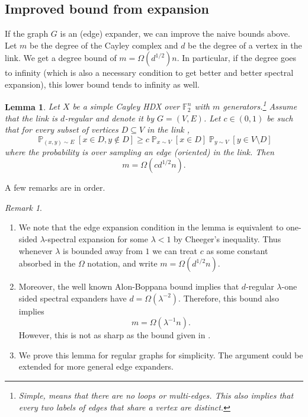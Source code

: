 \documentclass[10pt,a4paper]{article}
\newcommand{\prettyref}[1]{\cref{#1}}
\newtheorem{lemma}[theorem]{Lemma}
\theoremstyle{definition}
\theoremstyle{remark}
\newtheorem{remark}[theorem]{Remark}
\newcommand{\F}{\mathbb{F}}
\newcommand{\Psymb}{\mathbb{P}}
\DeclareMathOperator*{\ProbOp}{\Psymb}
\renewcommand{\Pr}{\ProbOp}
\newcommand{\Prob}[2][]{\Pr_{{#1}}\left[#2\right]} %
\renewcommand{\geq}{\geqslant}
\numberwithin{equation}{section}
\let\pref=\prettyref
\begin{document}
\subsection{Improved bound from expansion}
If the graph \(G\) is an (edge) expander, we can improve the naive bounds above. Let \(m\) be the degree of the Cayley complex and \(d\) be the degree of a vertex in the link. We get a degree bound of \(m = \Omega(d^{1/2})n\). In particular, if the degree goes to infinity (which is also a necessary condition to get better and better spectral expansion), this lower bound tends to infinity as well. %

\begin{lemma} \label{lem:deg-strong-lower-bound}
    Let \(X\) be a simple Cayley HDX over \(\F_2^n\) with \(m\) generators.\footnote{Simple, means that there are no loops or multi-edges. This also implies that every two labels of edges that share a vertex are distinct.} Assume that the link is \(d\)-regular and denote it by \(G=(V,E)\). Let \(c \in (0,1)\) be such that for every subset of vertices \(D \subseteq V\) in the link ,
    \[\Prob[(x,y)\sim E]{x\in D, y \notin D} \geq c\Prob[x\sim V]{x\in D} \Prob[y\sim V]{y\in V \setminus D}\]
    where the probability is over sampling an edge (oriented) in the link. Then
    \[m = \Omega(c d^{1/2} n).\]
\end{lemma}
A few remarks are in order.
\begin{remark}
    \begin{enumerate}
        \item We note that the edge expansion condition in the lemma is equivalent to one-sided $\lambda$-spectral expansion for some \(\lambda < 1\) by Cheeger's inequality. Thus whenever \(\lambda\) is bounded away from \(1\) we can treat \(c\) as some constant absorbed in the \(\Omega\) notation, and write \(m=\Omega(d^{1/2} n)\).
        \item Moreover, the well known Alon-Boppana bound implies that \(d\)-regular \(\lambda\)-one sided spectral expanders have \(d = \Omega(\lambda^{-2})\). Therefore, this bound also implies
        \[m = \Omega(\lambda^{-1} n).\]
        However, this is not as sharp as the bound given in \cite{alon1992simple}.
        \item We prove this lemma for regular graphs for simplicity. The argument could be extended for more general edge expanders.
    \end{enumerate}
\end{remark}
\end{document}
